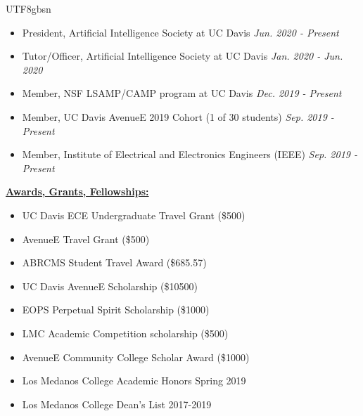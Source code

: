 \documentclass[11pt,a4paper,palatine]{moderncv}        %
\begin{document}
\begin{CJK*}{UTF8}{gbsn}
\begin{minipage}{\maincolumnwidth}
  \quad

      \begin{itemize}
          \item President, Artificial Intelligence Society at UC Davis \hfill {\itshape Jun. 2020 - Present}  
          \item Tutor/Officer, Artificial Intelligence Society at UC Davis \hfill {\itshape Jan. 2020 - Jun. 2020}
          \item Member, NSF LSAMP/CAMP program at UC Davis   \hfill {\itshape Dec. 2019 - Present}
          \item Member, UC Davis AvenueE 2019 Cohort (1 of 30 students) \hfill {\itshape Sep. 2019 - Present}
          \item Member, Institute of Electrical and Electronics Engineers (IEEE) \hfill {\itshape Sep. 2019 - Present}
      \end{itemize}%

  \quad

  \underline{\textbf{Awards, Grants, Fellowships:}}
  
  \quad

    	\begin{itemize}
          \item UC Davis ECE Undergraduate Travel Grant (\$500) 
          \item AvenueE Travel Grant (\$500) 
          \item ABRCMS Student Travel Award (\$685.57) 
          \item UC Davis AvenueE Scholarship (\$10500) 
          \item EOPS Perpetual Spirit Scholarship (\$1000)
          \item LMC Academic Competition scholarship (\$500)
          \item AvenueE Community College Scholar Award (\$1000)
          \item Los Medanos College Academic Honors Spring 2019
          \item Los Medanos College Dean's List 2017-2019
		\end{itemize}%
\end{minipage}%

      

\nocite{*}



\end{CJK*}
\end{document}
